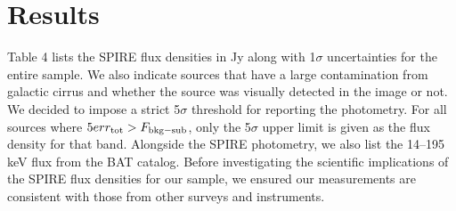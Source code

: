 \section{Results}
Table 4 lists the SPIRE flux densities in Jy along with 1$\sigma$ uncertainties for the entire sample. We also indicate sources that have a large contamination from galactic cirrus and whether the source was visually detected in the image or not. We decided to impose a strict 5$\sigma$ threshold for reporting the photometry. For all sources where $5 err_{\rm{tot}} > F_{\rm{bkg-sub}}$, only the 5$\sigma$ upper limit is given as the flux density for that band. Alongside the SPIRE photometry, we also list the 14--195 keV flux from the BAT catalog. Before investigating the scientific implications of the SPIRE flux densities for our sample, we ensured our measurements are consistent with those from other surveys and instruments.